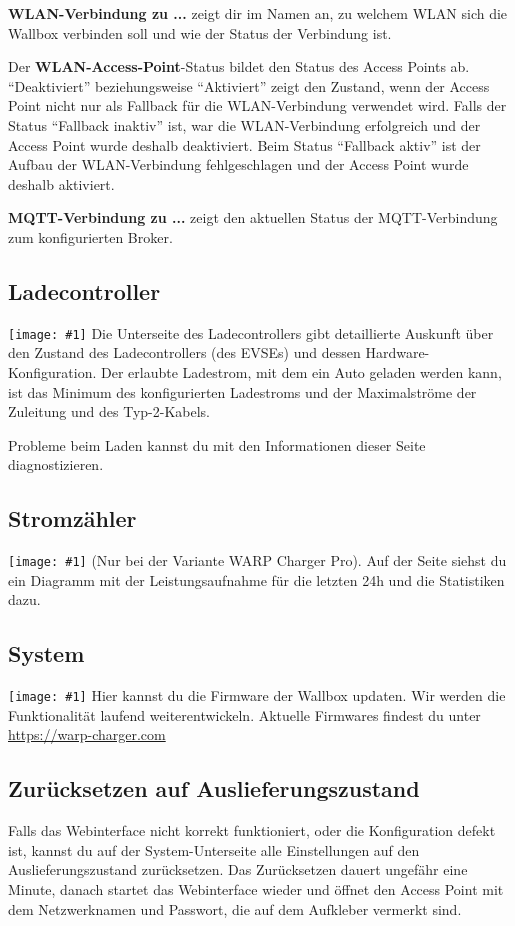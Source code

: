 \documentclass[a4paper,10pt]{article}
\newcommand{\gfx}[1]{\texttt{[image: \#1]}}
\begin{document}
\begin{multicols*}{2}
	\textbf{WLAN-Verbindung zu ...} zeigt dir im Namen an, zu welchem WLAN
	sich die Wallbox verbinden soll und wie der Status der Verbindung ist.

	Der \textbf{WLAN-Access-Point}-Status bildet den Status des Access Points ab.
	\enquote{Deaktiviert} beziehungsweise \enquote{Aktiviert} zeigt den Zustand, wenn der Access Point nicht
	nur als Fallback für die WLAN-Verbindung verwendet wird. Falls der Status \enquote{Fallback inaktiv} ist,
	war die WLAN-Verbindung erfolgreich und der Access Point wurde deshalb deaktiviert.
	Beim Status \enquote{Fallback aktiv} ist der Aufbau der WLAN-Verbindung fehlgeschlagen und der
	Access Point wurde deshalb aktiviert.

	\textbf{MQTT-Verbindung zu ...} zeigt den aktuellen Status der MQTT-Verbindung
	zum konfigurierten Broker.

	\subsection{Ladecontroller}
	\gfx{./img/resized/web_evse}
	Die Unterseite des Ladecontrollers gibt detaillierte Auskunft über den Zustand
	des Ladecontrollers (des EVSEs) und dessen Hardware-Konfiguration. Der
	erlaubte Ladestrom, mit dem ein Auto geladen werden kann, ist das Minimum des
	konfigurierten Ladestroms und der Maximalströme der Zuleitung und des Typ-2-Kabels.

	Probleme beim Laden kannst du mit den Informationen dieser
	Seite diagnostizieren.

	\subsection{Stromzähler}
	\gfx{./img/resized/web_meter}
	(Nur bei der Variante WARP Charger Pro). Auf der Seite
	siehst du ein Diagramm mit der Leistungsaufnahme für die letzten 24h und die
	Statistiken dazu.

	\subsection{System}
	\gfx{./img/resized/web_system}
	Hier kannst du die Firmware der Wallbox updaten. Wir werden die Funktionalität
	laufend weiterentwickeln. Aktuelle Firmwares findest du unter \url{https://warp-charger.com}

	\newpage
	\subsection{Zurücksetzen auf Auslieferungszustand}\label{reset}
	Falls das Webinterface nicht korrekt funktioniert, oder die Konfiguration defekt ist,
	kannst du auf der System-Unterseite alle Einstellungen auf den Auslieferungszustand zurücksetzen.
	Das Zurücksetzen dauert ungefähr eine Minute, danach startet das Webinterface wieder und öffnet
	den Access Point mit dem Netzwerknamen und Passwort, die auf dem Aufkleber vermerkt sind.


\end{multicols*}
\end{document}
